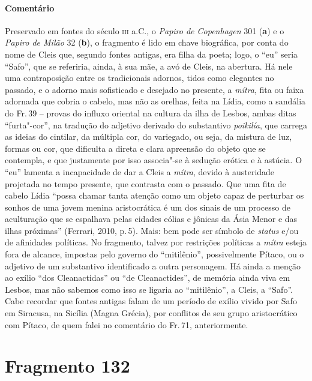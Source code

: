 {\paragraph{Comentário} Preservado em fontes do século \textsc{iii} a.C., o \textit{Papiro de Copenhagen} 301 (\textbf{a}) e o \textit{Papiro de Milão} 32 (\textbf{b}),
o fragmento é lido em chave biográfica, por conta do
nome de Cleis que, segundo fontes antigas, era filha da poeta; logo, o “eu” seria
``Safo”, que se referiria, ainda, à sua mãe, a avó de Cleis, na
abertura. Há nele uma contraposição entre os tradicionais adornos, tidos como
elegantes no passado, e o adorno mais sofisticado e desejado no presente, a
\textit{mítra}, fita ou faixa adornada que cobria o cabelo, mas não as orelhas,
feita na Lídia, como a sandália do Fr.\,39 -- provas do influxo oriental na
cultura da ilha de Lesbos, ambas ditas ``furta"-cor”, na tradução do
adjetivo derivado do substantivo \textit{poikilía}, que carrega as ideias do
cintilar, da múltipla cor, do variegado, ou seja, da mistura de luz, formas ou
cor, que dificulta a direta e clara apreensão do objeto que se contempla, e que
justamente por isso associa"-se à sedução erótica e à astúcia. O “eu” lamenta a
incapacidade de dar a Cleis a \textit{mítra}, devido à austeridade projetada no tempo presente, que contrasta com o passado. Que uma fita de cabelo Lídia “possa chamar tanta atenção como um objeto capaz de perturbar os sonhos de uma jovem menina aristocrática é um dos sinais de um processo de aculturação que se espalhava pelas cidades eólias e jônicas da Ásia Menor e das ilhas próximas” (Ferrari, 2010, p.\,5). Mais: bem pode ser símbolo de \textit{status} e/ou de afinidades políticas. No fragmento, talvez por restrições políticas a \textit{mítra} esteja fora de alcance,  impostas pelo governo do “mitilênio”, possivelmente
Pítaco, ou o adjetivo de um substantivo identificado a outra personagem. Há
ainda a menção ao exílio “dos Cleanactidas” ou “de Cleanactides”, de memória
ainda viva em Lesbos, mas não sabemos como isso se ligaria ao
“mitilênio”, a Cleis, a ``Safo”. Cabe recordar que fontes antigas falam
de um período de exílio vivido por Safo em Siracusa, na Sicília (Magna Grécia),
por conflitos de seu grupo aristocrático com Pítaco, de quem falei no comentário do Fr.\,71, anteriormente.}



\pagebreak
\section{Fragmento 132}


